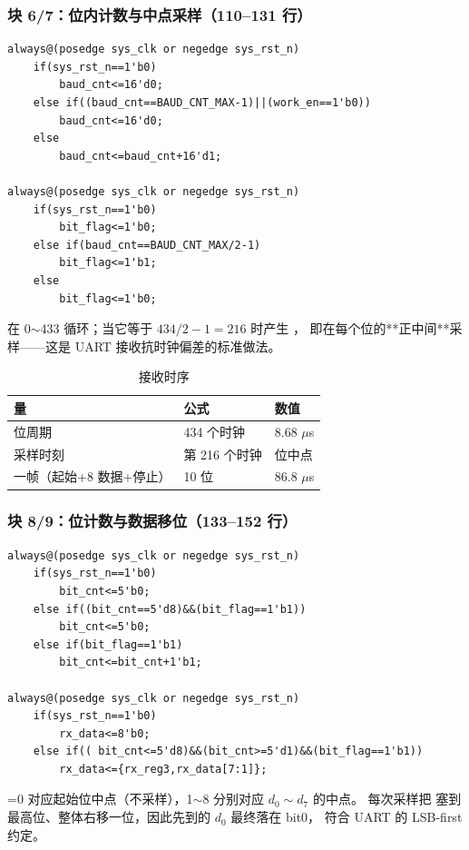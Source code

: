 \subsubsection{块 6/7：位内计数与中点采样（110--131 行）}

\begin{lstlisting}[style=vsnip]
always@(posedge sys_clk or negedge sys_rst_n)
    if(sys_rst_n==1'b0)
        baud_cnt<=16'd0;
    else if((baud_cnt==BAUD_CNT_MAX-1)||(work_en==1'b0))
        baud_cnt<=16'd0;
    else
        baud_cnt<=baud_cnt+16'd1;

always@(posedge sys_clk or negedge sys_rst_n)
    if(sys_rst_n==1'b0)
        bit_flag<=1'b0;
    else if(baud_cnt==BAUD_CNT_MAX/2-1)
        bit_flag<=1'b1;
    else
        bit_flag<=1'b0;
\end{lstlisting}

 在 0$\sim$433 循环；当它等于 $434/2-1=216$ 时产生 ，
即在每个位的**正中间**采样——这是 UART 接收抗时钟偏差的标准做法。

\begin{table}[htbp]
\centering
\small
\caption{接收时序}
\begin{tabular}{lll}
\toprule
量 & 公式 & 数值\\
\midrule
位周期 & 434 个时钟 & 8.68 $\mu$s\\
采样时刻 & 第 216 个时钟 & 位中点\\
一帧（起始+8 数据+停止） & 10 位 & 86.8 $\mu$s\\
\bottomrule
\end{tabular}
\end{table}

\subsubsection{块 8/9：位计数与数据移位（133--152 行）}

\begin{lstlisting}[style=vsnip]
always@(posedge sys_clk or negedge sys_rst_n)
    if(sys_rst_n==1'b0)
        bit_cnt<=5'b0;
    else if((bit_cnt==5'd8)&&(bit_flag==1'b1))
        bit_cnt<=5'b0;
    else if(bit_flag==1'b1)
        bit_cnt<=bit_cnt+1'b1;

always@(posedge sys_clk or negedge sys_rst_n)
    if(sys_rst_n==1'b0)
        rx_data<=8'b0;
    else if(( bit_cnt<=5'd8)&&(bit_cnt>=5'd1)&&(bit_flag==1'b1))
        rx_data<={rx_reg3,rx_data[7:1]};
\end{lstlisting}

=0 对应起始位中点（不采样），1$\sim$8 分别对应 $d_0\sim d_7$ 的中点。
每次采样把  塞到最高位、整体右移一位，因此先到的 $d_0$ 最终落在 bit0，
符合 UART 的 LSB-first 约定。

